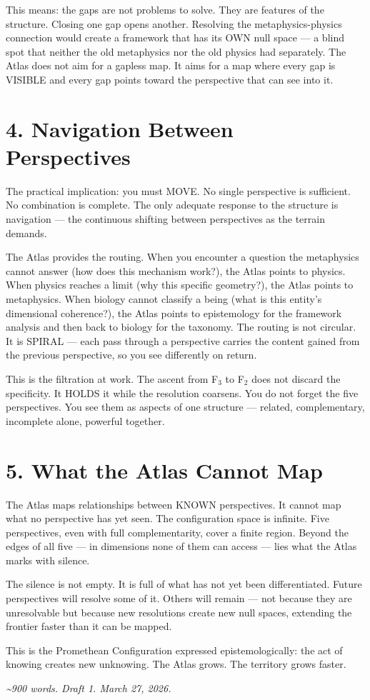 This means: the gaps are not problems to solve. They are features of the structure. Closing one gap opens another. Resolving the metaphysics-physics connection would create a framework that has its OWN null space — a blind spot that neither the old metaphysics nor the old physics had separately. The Atlas does not aim for a gapless map. It aims for a map where every gap is VISIBLE and every gap points toward the perspective that can see into it.


\section*{4. Navigation Between Perspectives}


The practical implication: you must MOVE. No single perspective is sufficient. No combination is complete. The only adequate response to the structure is navigation — the continuous shifting between perspectives as the terrain demands.


The Atlas provides the routing. When you encounter a question the metaphysics cannot answer (how does this mechanism work?), the Atlas points to physics. When physics reaches a limit (why this specific geometry?), the Atlas points to metaphysics. When biology cannot classify a being (what is this entity's dimensional coherence?), the Atlas points to epistemology for the framework analysis and then back to biology for the taxonomy. The routing is not circular. It is SPIRAL — each pass through a perspective carries the content gained from the previous perspective, so you see differently on return.


This is the filtration at work. The ascent from F$_3$ to F$_2$ does not discard the specificity. It HOLDS it while the resolution coarsens. You do not forget the five perspectives. You see them as aspects of one structure — related, complementary, incomplete alone, powerful together.


\section*{5. What the Atlas Cannot Map}


The Atlas maps relationships between KNOWN perspectives. It cannot map what no perspective has yet seen. The configuration space is infinite. Five perspectives, even with full complementarity, cover a finite region. Beyond the edges of all five — in dimensions none of them can access — lies what the Atlas marks with silence.


The silence is not empty. It is full of what has not yet been differentiated. Future perspectives will resolve some of it. Others will remain — not because they are unresolvable but because new resolutions create new null spaces, extending the frontier faster than it can be mapped.


This is the Promethean Configuration expressed epistemologically: the act of knowing creates new unknowing. The Atlas grows. The territory grows faster.


\bigskip\noindent\makebox[\textwidth]{\color{rulegray}\rule{5cm}{0.3pt}}\bigskip


\textit{\textasciitilde{}900 words. Draft 1. March 27, 2026.}

